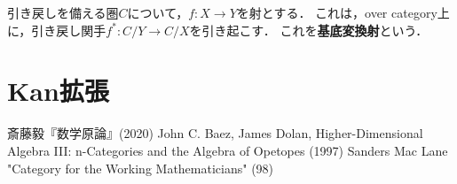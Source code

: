 \documentclass[uplatex,dvipdfmx]{jsreport}
\begin{document}
\begin{definition}
    引き戻しを備える圏$C$について，$f:X\to Y$を射とする．
    これは，over category上に，引き戻し関手$f^*:C/Y\to C/X$を引き起こす．
    これを\textbf{基底変換射}という．
\end{definition}

\section{Kan拡張}



\begin{thebibliography}{9}
    斎藤毅『数学原論』(2020)
    John C. Baez, James Dolan, Higher-Dimensional Algebra III: n-Categories and the Algebra of Opetopes (1997)
    Sanders Mac Lane "Category for the Working Mathematicians" (98)
\end{thebibliography}
\end{document}
